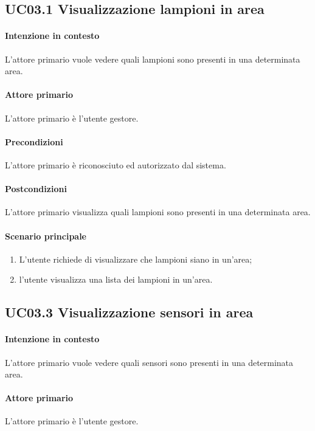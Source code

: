 \subsection{UC03.1 Visualizzazione lampioni in area}
\paragraph{Intenzione in contesto} L'attore primario vuole vedere quali lampioni sono presenti in una determinata area.

\paragraph{Attore primario} L'attore primario è l'utente gestore.
\paragraph{Precondizioni}L'attore primario è riconosciuto ed autorizzato dal sistema.
\paragraph{Postcondizioni} L'attore primario visualizza quali lampioni sono presenti in una determinata area.

\paragraph{Scenario principale}
\begin{enumerate}
    \item L'utente richiede di visualizzare che lampioni siano in un'area;
    \item l'utente visualizza una lista dei lampioni in un'area.
\end{enumerate}

\subsection{UC03.3 Visualizzazione sensori in area}
\paragraph{Intenzione in contesto} L'attore primario vuole vedere quali sensori sono presenti in una determinata area.
\paragraph{Attore primario} L'attore primario è l'utente gestore.
